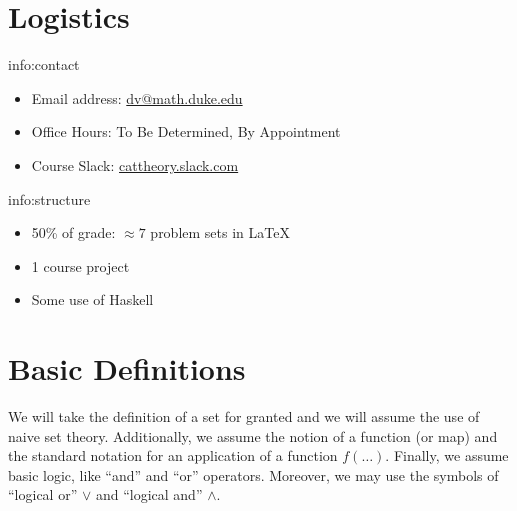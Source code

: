 



\section{Logistics}\label{sec:logistics}

\begin{info}{info:contact}
    \begin{itemize}
        \item Email address: \href{mailto:dv@math.duke.edu}{dv@math.duke.edu}
        \item Office Hours: To Be Determined, By Appointment
        \item Course Slack: \href{cattheory.slack.com}{cattheory.slack.com}
    \end{itemize}
\end{info}

\begin{info}{info:structure}
    \begin{itemize}
        \item 50\% of grade: \( \approx 7 \) problem sets in \LaTeX
        \item 1 course project
        \item Some use of Haskell
    \end{itemize}
\end{info}

\section{Basic Definitions}\label{sec:definitions}

We will take the definition of a set for granted and we will assume the use of naive set theory.
Additionally, we assume the notion of a function (or map) and the standard notation for an application of a function \( f(\ldots) \).
Finally, we assume basic logic, like ``and'' and ``or'' operators.
Moreover, we may use the symbols of ``logical or'' \( \lor \) and ``logical and'' \( \land \).

